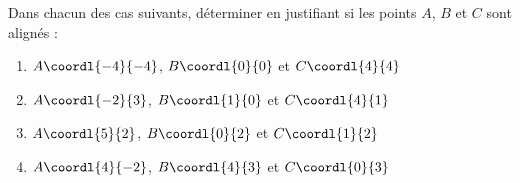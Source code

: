 \begin{exo}{}
	Dans chacun des cas suivants, déterminer en justifiant si les points $A$, $B$ et $C$ sont alignés :
	\begin{enumerate}
		\item $A\coordl{-4}{-4}$, $B\coordl{0}{0}$ et $C\coordl{4}{4}$
		\item $A\coordl{-2}{3}$, $B\coordl{1}{0}$ et $C\coordl{4}{1}$
		\item $A\coordl{5}{2}$, $B\coordl{0}{2}$ et $C\coordl{1}{2}$
		\item $A\coordl{4}{-2}$, $B\coordl{4}{3}$ et $C\coordl{0}{3}$
	\end{enumerate}
\end{exo}
